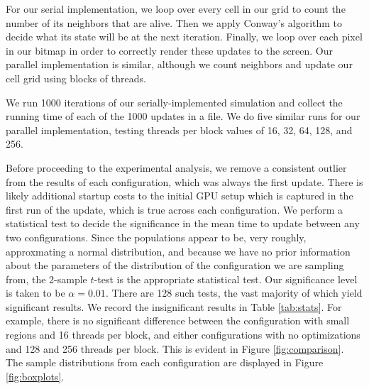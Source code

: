\documentclass[onecolumn,12pt]{IEEEtran}
\begin{document}
  For our serial implementation, we loop over every cell in our grid to count the
  number of its neighbors that are alive. Then we apply Conway's algorithm to
  decide what its state will be at the next iteration. Finally, we loop over each
  pixel in our bitmap in order to correctly render these updates to the screen.
  Our parallel implementation is similar, although we count neighbors and update
  our cell grid using blocks of threads. 

  We run 1000 iterations of our serially-implemented simulation and collect the
  running time of each of the 1000 updates in a file. We do five similar runs
  for our parallel implementation, testing threads per block values of 16, 32,
  64, 128, and 256.

  Before proceeding to the experimental analysis, we remove a consistent outlier
  from the results of each configuration, which was always the first update.
  There is likely additional startup costs to the initial GPU setup which is
  captured in the first run of the update, which is true across each
  configuration. We perform a statistical test to decide the significance in the
  mean time to update between any two configurations. Since the populations
  appear to be, very roughly, approxmating a normal distribution, and because we
  have no prior information about the parameters of the distribution of the
  configuration we are sampling from, the 2-sample $t$-test is the appropriate
  statistical test. Our significance level is taken to be $\alpha = 0.01$. There
  are 128 such tests, the vast majority of which yield significant results. We
  record the insignificant results in Table \ref{tab:stats}. For example, there
  is no significant difference between the configuration with small regions and
  16 threads per block, and either configurations with no optimizations and 128
  and 256 threads per block.  This is evident in Figure \ref{fig:comparison}. The
  sample distributions from each configuration are displayed in Figure
  \ref{fig:boxplots}.
\end{document}
